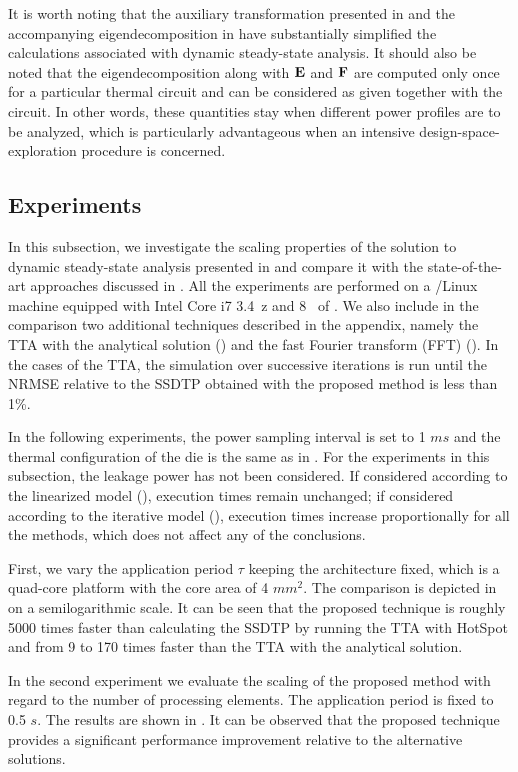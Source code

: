 It is worth noting that the auxiliary transformation presented in
 and the accompanying eigendecomposition in
 have substantially simplified the calculations
associated with dynamic steady-state analysis. It should also be noted that the
eigendecomposition along with $\mathbf{E}$ and $\mathbf{F}$ are computed only once for a
particular thermal  circuit and can be considered as given together with
the circuit. In other words, these quantities stay when different power profiles
are to be analyzed, which is particularly advantageous when an intensive
design-space-exploration procedure is concerned.

\subsection{Experiments}

In this subsection, we investigate the scaling properties of the solution to
dynamic steady-state analysis presented in 
and compare it with the state-of-the-art approaches discussed in
. All the experiments are performed on a
/Linux machine equipped with Intel Core i7 3.4~z and 8~ of
. We also include in the comparison two additional techniques described
in the appendix, namely the TTA with the analytical solution
() and the fast Fourier transform (FFT)
(). In the cases of the TTA, the simulation over
successive iterations is run until the NRMSE relative to the SSDTP obtained with
the proposed method is less than 1\%.

In the following experiments, the power sampling interval is set to 1 $ms$ and
the thermal configuration of the die is the same as in . For
the experiments in this subsection, the leakage power has not been considered.
If considered according to the linearized model
(), execution times remain unchanged; if
considered according to the iterative model
(), execution times increase
proportionally for all the methods, which does not affect any of the
conclusions.

First, we vary the application period $\tau$ keeping the architecture fixed,
which is a quad-core platform with the core area of 4 $mm^2$. The comparison is
depicted in  on a semilogarithmic scale. It can be seen that
the proposed technique is roughly 5000 times faster than calculating the SSDTP
by running the TTA with HotSpot and from 9 to 170 times faster than the TTA with
the analytical solution.

In the second experiment we evaluate the scaling of the proposed method with
regard to the number of processing elements. The application period is fixed to
0.5 $s$. The results are shown in . It can be observed that
the proposed technique provides a significant performance improvement relative
to the alternative solutions.
